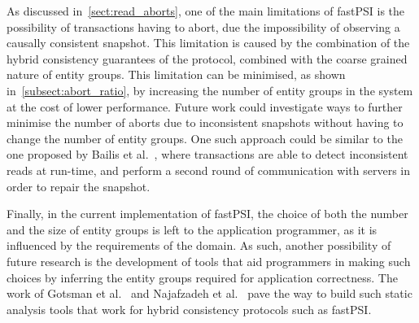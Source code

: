 As discussed in~\ref{sect:read_aborts}, one of the main limitations of fastPSI is the possibility of transactions having to abort, due the impossibility of observing a causally consistent snapshot. This limitation is caused by the combination of the hybrid consistency guarantees of the protocol, combined with the coarse grained nature of entity groups. This limitation can be minimised, as shown in~\ref{subsect:abort_ratio}, by increasing the number of entity groups in the system at the cost of lower performance. Future work could investigate ways to further minimise the number of aborts due to inconsistent snapshots without having to change the number of entity groups. One such approach could be similar to the one proposed by Bailis et al.~\citep{bailis_ramp}, where transactions are able to detect inconsistent reads at run-time, and perform a second round of communication with servers in order to repair the snapshot.

Finally, in the current implementation of fastPSI, the choice of both the number and the size of entity groups is left to the application programmer, as it is influenced by the requirements of the domain. As such, another possibility of future research is the development of tools that aid programmers in making such choices by inferring the entity groups required for application correctness. The work of Gotsman et al.~\citep{gotsman_cher} and Najafzadeh et al.~\citep{cise_tool} pave the way to build such static analysis tools that work for hybrid consistency protocols such as fastPSI.

